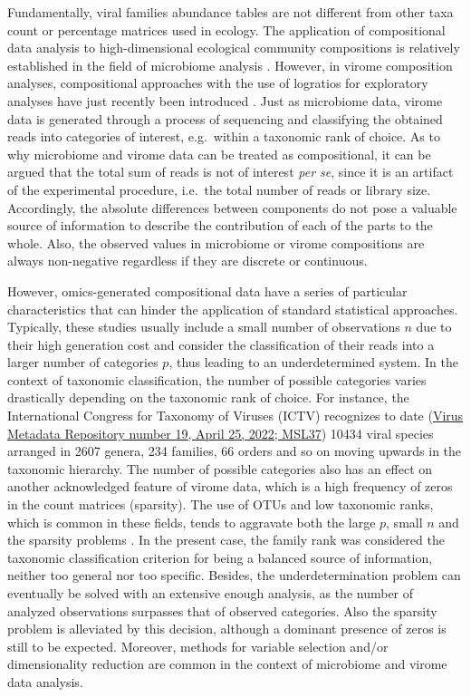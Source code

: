 \documentclass[
  openany]{book}
\begin{document}
Fundamentally, viral families abundance tables are not different from other taxa count or percentage matrices used in ecology. The application of compositional data analysis to high-dimensional ecological community compositions is relatively established in the field of microbiome analysis \autocite{Xia2018,Tsilimigras2016}. However, in virome composition analyses, compositional approaches with the use of logratios for exploratory analyses have just recently been introduced \autocite{Zuo2020,Yan2021}. Just as microbiome data, virome data is generated through a process of sequencing and classifying the obtained reads into categories of interest, e.g.~within a taxonomic rank of choice. As to why microbiome and virome data can be treated as compositional, it can be argued that the total sum of reads is not of interest \emph{per se}, since it is an artifact of the experimental procedure, i.e.~the total number of reads or library size. Accordingly, the absolute differences between components do not pose a valuable source of information to describe the contribution of each of the parts to the whole. Also, the observed values in microbiome or virome compositions are always non-negative regardless if they are discrete or continuous.

However, omics-generated compositional data have a series of particular characteristics that can hinder the application of standard statistical approaches. Typically, these studies usually include a small number of observations \(n\) due to their high generation cost and consider the classification of their reads into a larger number of categories \(p\), thus leading to an underdetermined system. In the context of taxonomic classification, the number of possible categories varies drastically depending on the taxonomic rank of choice. For instance, the International Congress for Taxonomy of Viruses (ICTV) recognizes to date (\href{https://talk.ictvonline.org/taxonomy/vmr/m/vmr-file-repository/13426}{Virus Metadata Repository number 19, April 25, 2022; MSL37}) 10434 viral species arranged in 2607 genera, 234 families, 66 orders and so on moving upwards in the taxonomic hierarchy. The number of possible categories also has an effect on another acknowledged feature of virome data, which is a high frequency of zeros in the count matrices (sparsity). The use of OTUs and low taxonomic ranks, which is common in these fields, tends to aggravate both the large \(p\), small \(n\) and the sparsity problems \autocite{Xia2017}. In the present case, the family rank was considered the taxonomic classification criterion for being a balanced source of information, neither too general nor too specific. Besides, the underdetermination problem can eventually be solved with an extensive enough analysis, as the number of analyzed observations surpasses that of observed categories. Also the sparsity problem is alleviated by this decision, although a dominant presence of zeros is still to be expected. Moreover, methods for variable selection and/or dimensionality reduction are common in the context of microbiome and virome data analysis.
\end{document}
